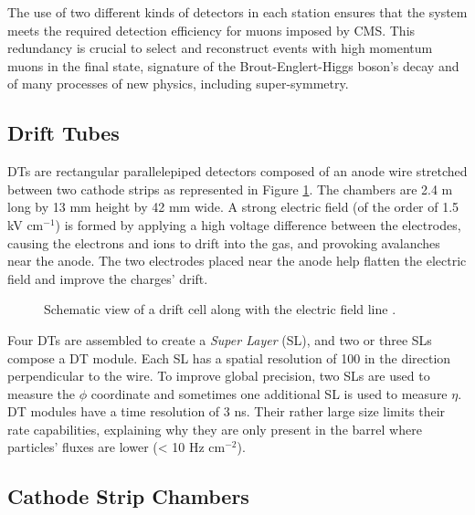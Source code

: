     			The use of two different kinds of detectors in each station ensures that the system meets the required detection efficiency for muons imposed by CMS. This redundancy is crucial to select and reconstruct events with high momentum muons in the final state, signature of the Brout-Englert-Higgs boson's decay and of many processes of new physics, including super-symmetry.

    		\subsection{Drift Tubes}
    		\label{sec:muon_chambers__drift_tubes}

    			DTs are rectangular parallelepiped detectors composed of an anode wire stretched between two cathode strips as represented in Figure \ref{fig:muon_chambers__dt}. The chambers are 2.4 m long by 13 mm height by 42 mm wide. A strong electric field (of the order of 1.5 kV cm$ ^{-1} $) is formed by applying a high voltage difference between the electrodes, causing the electrons and ions to drift into the gas, and provoking avalanches near the anode. The two electrodes placed near the anode help flatten the electric field and improve the charges' drift. \\

    			\begin{figure}[h!]
    				\centering
    				\caption{Schematic view of a drift cell along with the electric field line \Cite{CMS_at_LHC}.}
    				\label{fig:muon_chambers__dt}
    			\end{figure}

    			Four DTs are assembled to create a \emph{Super Layer} (SL), and two or three SLs compose a DT module. Each SL has a spatial resolution of 100 \um{} in the direction perpendicular to the wire. To improve global precision, two SLs are used to measure the $ \phi $ coordinate and sometimes one additional SL is used to measure $ \eta $. DT modules have a time resolution of 3 ns. Their rather large size limits their rate capabilities, explaining why they are only present in the barrel where particles' fluxes are lower (< 10 Hz cm$ ^{-2} $).

    		\subsection{Cathode Strip Chambers}
    		\label{sec:muon_chambers__cathode_strip_chambers}

